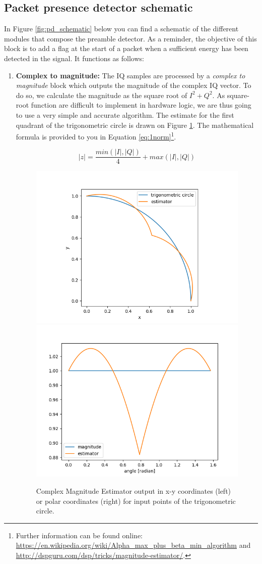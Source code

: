 \subsection{Packet presence detector schematic}
In Figure \ref{fig:pd_schematic} below you can find a schematic of the different modules that compose the preamble detector. As a reminder, the objective of this block is to add a flag at the start of a packet when a sufficient energy has been detected in the signal. It functions as follows:
\begin{enumerate}
    \item \textbf{Complex to magnitude: } The IQ samples are processed by a \textit{complex to magnitude} block which outputs the magnitude of the complex IQ vector.
    To do so, we calculate the magnitude as the square root of $I^2+Q^2$. As square-root function are difficult to implement in hardware logic, we are thus going to use a very simple and accurate algorithm. The estimate for the first quadrant of the trigonometric circle is drawn on Figure \ref{fig:cmplx2mag}. The mathematical formula is provided to you in Equation \ref{eq:1norm}\footnote{Further information can be found online: \url{https://en.wikipedia.org/wiki/Alpha_max_plus_beta_min_algorithm} and \url{http://dspguru.com/dsp/tricks/magnitude-estimator/}.}.

    \begin{equation}
        |z| = \frac{min(|I|,|Q|)}{4} + max(|I|,|Q|)
        \label{eq:1norm}
    \end{equation}

    \begin{figure}[h]
        \centering
        \includegraphics[width=0.45\linewidth]{figures/trigo.png}
        \includegraphics[width=0.45\linewidth]{figures/angle.png}
        \caption{Complex Magnitude Estimator output in x-y coordinates (left) or polar coordinates (right) for input points of the trigonometric circle.}
        \label{fig:cmplx2mag}
    \end{figure}


\end{enumerate}

